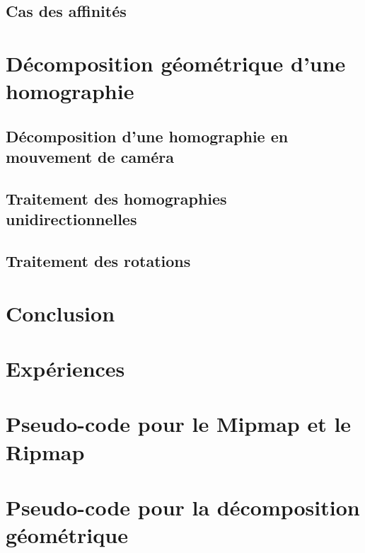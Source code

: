 \documentclass[a4paper,11pt]{article}
\theoremstyle{plain}
\theoremstyle{definition}
\theoremstyle{remark}
\begin{document}
		\subsection{Cas des affinités}
			\label{szeliski_section}
	\section{Décomposition géométrique d'une homographie}
		\label{decomp_geo_hom}
		\subsection{Décomposition d'une homographie en mouvement de caméra}
		\subsection{Traitement des homographies unidirectionnelles}
			\label{HomoboxRipmap}
		\subsection{Traitement des rotations}
			\label{YaroSzeli}
	\clearpage
	\section*{Conclusion}
			
	\clearpage
	\section{Expériences}
		\label{experiences}
		
		
		
	\clearpage
	\appendix
	\label{pseudo_code}
	\section{Pseudo-code pour le Mipmap et le Ripmap}
	\section{Pseudo-code pour la décomposition géométrique}
		
	\nocite{*}
	
	
\end{document}
